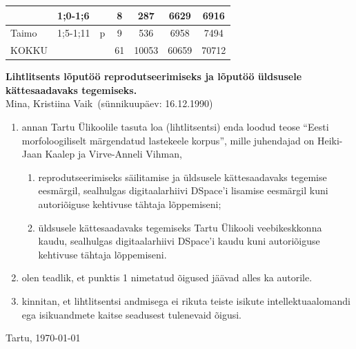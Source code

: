 \documentclass[12pt]{article}
\def\autor{Kristiina Vaik}
\def\pealkiri{Eesti morfoloogiliselt märgendatud lastekeele korpus}
\begin{document}
\begin{table}[H]
{\begin{tabular}{|l|l|c|c|c|c|c|}
                        & 1;0-1;6   &                           & 8                               & 287                              & 6629                              & 6916                       \\ \hline
Taimo                   & 1;5-1;11  & p                         & 9                               & 536                              & 6958                              & 7494                       \\ \hline\hline
KOKKU                   & \multicolumn{2}{l|}{}                 & 61                              & 10053                            & 60659                             & 70712                      \\ \hline
\end{tabular}}
\end{table}


\newpage
\cleardoublepage
{}
{}



\newpage
\pagestyle{empty}

\textbf{Lihtlitsents lõputöö reprodutseerimiseks ja
    lõputöö üldsusele kätte\-saa\-davaks tegemiseks.}\\[0.3cm]

Mina, \autor\ (sünnikuupäev: 16.12.1990)
\begin{enumerate}
    \item annan Tartu Ülikoolile tasuta loa (lihtlitsentsi)
    enda loodud teose ``\pealkiri'', mille juhendajad on Heiki-Jaan Kaalep ja Virve-Anneli Vihman,
    \begin{enumerate}[leftmargin=0.68cm]
        \item reprodutseerimiseks säilitamise ja üldsusele
        kättesaadavaks tegemise ees\-märgil, sealhulgas
        digitaalarhiivi DSpace'i lisamise eesmärgil kuni
        autoriõiguse kehtivuse tähtaja lõppemiseni;
        \item üldsusele kättesaadavaks tegemiseks Tartu Ülikooli
        veebikeskkonna kaudu, sealhulgas digitaalarhiivi
        DSpace'i kaudu kuni autoriõiguse kehti\-vuse tähtaja lõppemiseni.
    \end{enumerate}
    \item olen teadlik, et punktis 1 nimetatud õigused jäävad
    alles ka autorile.
    \item kinnitan, et lihtlitsentsi andmisega ei rikuta teiste
    isikute intellektuaalo\-mandi ega isikuandmete kaitse
    seadusest tulenevaid õigusi.
\end{enumerate}

\vfill

\begin{center}
Tartu, \today
\end{center}
\end{document}
